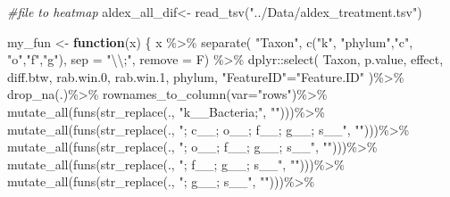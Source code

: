 \documentclass[]{interact}
\theoremstyle{plain}%
\theoremstyle{definition}
\theoremstyle{remark}
\newenvironment{Shaded}{\begin{snugshade}}{\end{snugshade}}
\newcommand{\AttributeTok}[1]{\textcolor[rgb]{0.77,0.63,0.00}{#1}}
\newcommand{\CommentTok}[1]{\textcolor[rgb]{0.56,0.35,0.01}{\textit{#1}}}
\newcommand{\ControlFlowTok}[1]{\textcolor[rgb]{0.13,0.29,0.53}{\textbf{#1}}}
\newcommand{\FloatTok}[1]{\textcolor[rgb]{0.00,0.00,0.81}{#1}}
\newcommand{\FunctionTok}[1]{\textcolor[rgb]{0.00,0.00,0.00}{#1}}
\newcommand{\NormalTok}[1]{#1}
\newcommand{\OtherTok}[1]{\textcolor[rgb]{0.56,0.35,0.01}{#1}}
\newcommand{\SpecialCharTok}[1]{\textcolor[rgb]{0.00,0.00,0.00}{#1}}
\newcommand{\StringTok}[1]{\textcolor[rgb]{0.31,0.60,0.02}{#1}}
\begin{document}
\begin{Shaded}
\begin{Highlighting}[]
\CommentTok{\#file to heatmap}
\NormalTok{aldex\_all\_dif}\OtherTok{\textless{}{-}} \FunctionTok{read\_tsv}\NormalTok{(}\StringTok{"../Data/aldex\_treatment.tsv"}\NormalTok{)}

\NormalTok{my\_fun }\OtherTok{\textless{}{-}} \ControlFlowTok{function}\NormalTok{(x) \{ }
\NormalTok{  x }\SpecialCharTok{\%\textgreater{}\%} \FunctionTok{separate}\NormalTok{(}
    \StringTok{"Taxon"}\NormalTok{, }\FunctionTok{c}\NormalTok{(}\StringTok{"k"}\NormalTok{, }\StringTok{"phylum"}\NormalTok{,}\StringTok{"c"}\NormalTok{, }\StringTok{"o"}\NormalTok{,}\StringTok{"f"}\NormalTok{,}\StringTok{"g"}\NormalTok{),}
    \AttributeTok{sep =} \StringTok{"}\SpecialCharTok{\textbackslash{}\textbackslash{}}\StringTok{;"}\NormalTok{, }\AttributeTok{remove =}\NormalTok{ F) }\SpecialCharTok{\%\textgreater{}\%}\NormalTok{ dplyr}\SpecialCharTok{::}\FunctionTok{select}\NormalTok{(}
\NormalTok{      Taxon, p.value, effect, diff.btw, rab.win}\FloatTok{.0}\NormalTok{, rab.win}\FloatTok{.1}\NormalTok{, phylum, }
      \StringTok{"FeatureID"}\OtherTok{=}\StringTok{"Feature.ID"}\NormalTok{ )}\SpecialCharTok{\%\textgreater{}\%} 
    \FunctionTok{drop\_na}\NormalTok{(.)}\SpecialCharTok{\%\textgreater{}\%} 
    \FunctionTok{rownames\_to\_column}\NormalTok{(}\AttributeTok{var=}\StringTok{"rows"}\NormalTok{)}\SpecialCharTok{\%\textgreater{}\%}       
    \FunctionTok{mutate\_all}\NormalTok{(}\FunctionTok{funs}\NormalTok{(}\FunctionTok{str\_replace}\NormalTok{(., }\StringTok{"k\_\_Bacteria;"}\NormalTok{, }\StringTok{""}\NormalTok{)))}\SpecialCharTok{\%\textgreater{}\%}
    \FunctionTok{mutate\_all}\NormalTok{(}\FunctionTok{funs}\NormalTok{(}\FunctionTok{str\_replace}\NormalTok{(., }\StringTok{"; c\_\_; o\_\_; f\_\_; g\_\_; s\_\_"}\NormalTok{, }\StringTok{""}\NormalTok{)))}\SpecialCharTok{\%\textgreater{}\%} 
    \FunctionTok{mutate\_all}\NormalTok{(}\FunctionTok{funs}\NormalTok{(}\FunctionTok{str\_replace}\NormalTok{(., }\StringTok{"; o\_\_; f\_\_; g\_\_; s\_\_"}\NormalTok{, }\StringTok{""}\NormalTok{)))}\SpecialCharTok{\%\textgreater{}\%} 
    \FunctionTok{mutate\_all}\NormalTok{(}\FunctionTok{funs}\NormalTok{(}\FunctionTok{str\_replace}\NormalTok{(., }\StringTok{"; f\_\_; g\_\_; s\_\_"}\NormalTok{, }\StringTok{""}\NormalTok{)))}\SpecialCharTok{\%\textgreater{}\%}
    \FunctionTok{mutate\_all}\NormalTok{(}\FunctionTok{funs}\NormalTok{(}\FunctionTok{str\_replace}\NormalTok{(., }\StringTok{"; g\_\_; s\_\_"}\NormalTok{, }\StringTok{""}\NormalTok{)))}\SpecialCharTok{\%\textgreater{}\%}

\end{Highlighting}
\end{Shaded}
\end{document}
